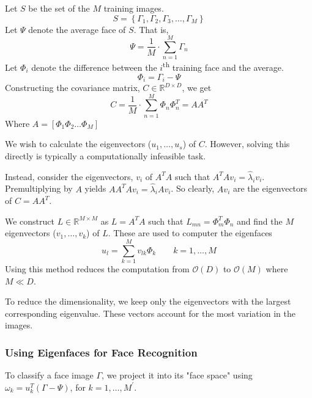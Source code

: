 \documentclass{article}
\begin{document}
\vspace{12pt} \noindent Let $S$ be the set of the $M$ training images.
\begin{equation}
	S = \left\{\Gamma_1, \Gamma_2, \Gamma_3, \ldots, \Gamma_M\right\}
\end{equation}
Let $\Psi$ denote the average face of $S$. That is,
\begin{equation}
	\Psi = \frac{1}{M}\cdot\sum_{n=1}^{M}\Gamma_n
\end{equation}
Let $\Phi_i$ denote the difference between the $i$\textsuperscript{th} training face and the average.
\begin{equation}
	\Phi_i = \Gamma_i - \Psi
\end{equation}
Constructing the covariance matrix, $C \in \mathbb{R}^{D\times D}$, we get
\begin{equation}
	C = \frac{1}{M}\cdot\sum_{n=1}^{M}\Phi_n \Phi_n^T
	  = AA^T
\end{equation}
Where $A = [\Phi_1 \Phi_2 \ldots \Phi_M]$

We wish to calculate the eigenvectors ($u_1, \ldots, u_s$) of $C$. However, solving this directly is typically a computationally infeasible task.

Instead, consider the eigenvectors, $v_i$ of $A^TA$ such that $A^TAv_i=\widehat{\lambda}_iv_i$. Premultiplying by $A$ yields $AA^TAv_i=\widehat{\lambda}_iAv_i$. So clearly, $Av_i$ are the eigenvectors of $C=AA^T$.

We construct $L \in \mathbb{R}^{M\times M}$ as $L = A^T A$ such that $L_{mn} = \Phi^T_m \Phi_n$ and find the $M$ eigenvectors ($v_1, \ldots, v_k$) of $L$. These are used to computer the eigenfaces
\begin{equation}
	u_l = \sum_{k=1}^{M}v_{lk}\Phi_k \qquad k=1, \ldots, M
\end{equation}
Using this method reduces the computation from $\mathcal{O}(D)$ to $\mathcal{O}(M)$ where $M\ll D$.

To reduce the dimensionality, we keep only the eigenvectors with the largest corresponding eigenvalue. These vectors account for the most variation in the images.

\subsubsection{Using Eigenfaces for Face Recognition}
To classify a face image $\Gamma$, we project it into its "face space" using $\omega_k = u^T_k(\Gamma - \Psi)$, for $k = 1, \ldots, M^\prime$.
\end{document}
